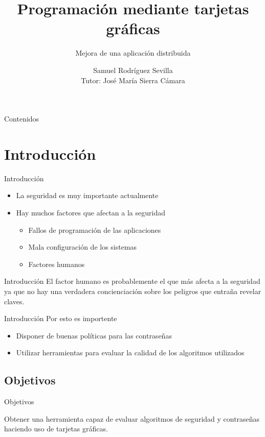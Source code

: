 \documentclass[12pt]{beamer}
\title{Programación mediante tarjetas gráficas}
\subtitle{Mejora de una aplicación distribuida}
\author{Samuel Rodríguez Sevilla\\Tutor: José María Sierra Cámara}
\begin{document}
\frame{\titlepage}



\begin{frame}{Contenidos}
	\tableofcontents[pausesections]
\end{frame}

\section{Introducción}
\begin{frame}{Introducción}
	\begin{itemize}
		\item La seguridad es muy importante actualmente
		\item Hay muchos factores que afectan a la seguridad
		\begin{itemize}
			\item Fallos de programación de las aplicaciones
			\item Mala configuración de los sistemas
			\item Factores humanos
		\end{itemize}
	\end{itemize}
\end{frame}

\begin{frame}{Introducción}
	El factor humano es probablemente el que más afecta a la seguridad ya que no hay una verdadera concienciación sobre los peligros que entraña revelar claves.

\end{frame}

\begin{frame}{Introducción}
	Por esto es importente
	\pause
	\begin{itemize}
		\item Disponer de buenas políticas para las contraseñas
		\item Utilizar herramientas para evaluar la calidad de los algoritmos utilizados
	\end{itemize}
\end{frame}

\subsection{Objetivos}
\begin{frame}{Objetivos}
	\begin{center}
		Obtener una herramienta capaz de evaluar algoritmos de seguridad y contraseñas haciendo uso de tarjetas gráficas.
	\end{center}
\end{frame}
\end{document}
